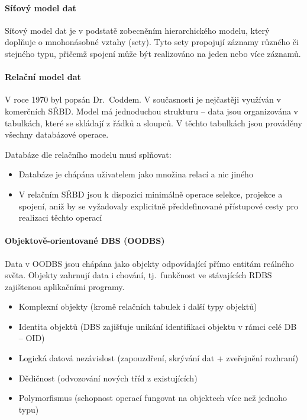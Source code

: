 \documentclass[12pt,a4paper]{article}
\begin{document}
\paragraph{Síťový model dat}
Síťový model dat je v podstatě zobecněním hierarchického modelu, který doplňuje o mnohonásobné
vztahy (sety). Tyto sety propojují záznamy různého či stejného typu, přičemž spojení může být
realizováno na jeden nebo více záznamů.

\paragraph{Relační model dat}
V roce 1970 byl popsán Dr.~Coddem. V současnosti je nejčastěji využíván v komerčních SŘBD.
Model má jednoduchou strukturu -- data jsou organizována v tabulkách, které se skládají z řádků
a sloupců. V těchto tabulkách jsou prováděny všechny databázové operace.

Databáze dle relačního modelu musí splňovat:
\begin{itemize}
  \item Databáze je chápána uživatelem jako množina relací a nic jiného
  \item V relačním SŘBD jsou k dispozici minimálně operace selekce, projekce a spojení, aniž by se
    vyžadovaly explicitně předdefinované přístupové cesty pro realizaci těchto operací
\end{itemize}

\paragraph{Objektově-orientované DBS (OODBS)}
Data v OODBS jsou chápána jako objekty odpovídající přímo entitám reálného světa. Objekty zahrnují
data i chování, tj.~funkčnost ve stávajících RDBS zajištenou aplikačními programy.
\begin{itemize}
  \item Komplexní objekty (kromě relačních tabulek i další typy objektů)
  \item Identita objektů (DBS zajišťuje unikání identifikaci objektu v rámci celé DB -- OID)
  \item Logická datová nezávislost (zapouzdření, skrývání dat + zveřejnění rozhraní)
  \item Dědičnost (odvozování nových tříd z existujících)
  \item Polymorfismus (schopnost operací fungovat na objektech více než jednoho typu)
\end{itemize}
\end{document}
